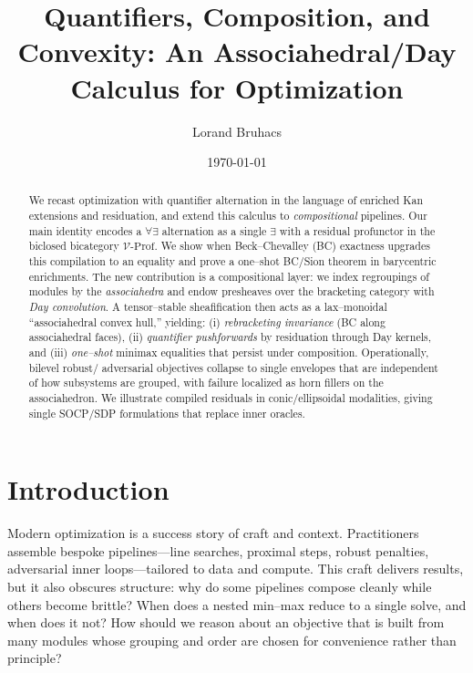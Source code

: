 \documentclass[11pt]{article}
\title{Quantifiers, Composition, and Convexity: An Associahedral/Day Calculus for Optimization}
\author{Lorand Bruhacs}
\date{\today}
\numberwithin{equation}{section}
\theoremstyle{upright}
\newcommand{\V}{\mathcal{V}}
\newcommand{\Prof}{\mathrm{Prof}}
\begin{document}
\maketitle

\begin{abstract}
We recast optimization with quantifier alternation in the language of enriched Kan extensions and residuation, and extend this calculus to \emph{compositional} pipelines. Our main identity encodes a $\forall\exists$ alternation as a single $\exists$ with a residual profunctor in the biclosed bicategory $\V\text{-}\Prof$. We show when Beck--Chevalley (BC) exactness upgrades this compilation to an equality and prove a one–shot BC/Sion theorem in barycentric enrichments. The new contribution is a compositional layer: we index regroupings of modules by the \emph{associahedra} and endow presheaves over the bracketing category with \emph{Day convolution}. A tensor–stable sheafification then acts as a lax–monoidal “associahedral convex hull,” yielding: (i) \emph{rebracketing invariance} (BC along associahedral faces), (ii) \emph{quantifier pushforwards} by residuation through Day kernels, and (iii) \emph{one–shot} minimax equalities that persist under composition. Operationally, bilevel robust/ adversarial objectives collapse to single envelopes that are independent of how subsystems are grouped, with failure localized as horn fillers on the associahedron. We illustrate compiled residuals in conic/ellipsoidal modalities, giving single SOCP/SDP formulations that replace inner oracles.
\end{abstract}

\tableofcontents

\section{Introduction}
\label{sec:intro}

Modern optimization is a success story of craft and context. Practitioners assemble bespoke pipelines—line searches, proximal steps, robust penalties, adversarial inner loops—tailored to data and compute. This craft delivers results, but it also obscures structure: why do some pipelines compose cleanly while others become brittle? When does a nested min--max reduce to a single solve, and when does it not? How should we reason about an objective that is built from many modules whose grouping and order are chosen for convenience rather than principle?
\end{document}
